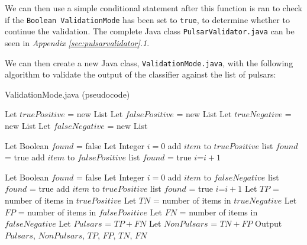 \documentclass{article}
\begin{document}
\begin{appendices}
\begin{subappendices}
        We can then use a simple conditional statement after this function is ran to check if the \verb|Boolean ValidationMode| has been set to \verb|true|, to determine whether to continue the validation. The complete Java class \verb|PulsarValidator.java| can be seen in \emph{Appendix \ref{sec:pulsarvalidator}.1}.
        
        We can then create a new Java class, \verb|ValidationMode.java|, with the following algorithm to validate the output of the classifier against the list of pulsars:
        
        \begin{algorithm}[H]
            \caption{ValidationMode.java (pseudocode)}
            \begin{algorithmic}
                \State Let $truePositive$ = new List
                \State Let $falsePositive$ = new List
                \State Let $trueNegative$ = new List
                \State Let $falseNegative$ = new List
                
                    \State Let Boolean $found$ = false
                    \State Let Integer $i=0$
                            \State add $item$ to $truePositive$ list
                            \State $found$ = true
                            \State add $item$ to $falsePositive$ list
                            \State $found$ = true
                        \Else
                            \State $i$=$i+1$
                        \EndIf
                    \EndWhile
                \EndFor
        
                    \State Let Boolean $found$ = false
                    \State Let Integer $i=0$
                            \State add $item$ to $falseNegative$ list
                            \State $found$ = true
                            \State add $item$ to $truePositive$ list
                            \State $found$ = true
                        \Else
                            \State $i$=$i+1$
                        \EndIf
                    \EndWhile
                \EndFor
                \State Let $TP$ = number of items in $truePositive$
                \State Let $TN$ = number of items in $trueNegative$
                \State Let $FP$ = number of items in $falsePositive$
                \State Let $FN$ = number of items in $falseNegative$
                \State Let $Pulsars$ = $TP+FN$
                \State Let $NonPulsars$ = $TN+FP$
                \State Output $Pulsars$, $NonPulsars$, $TP$, $FP$, $TN$, $FN$
            \end{algorithmic}
        \end{algorithm}
        

\end{subappendices}
\end{appendices}
\end{document}
